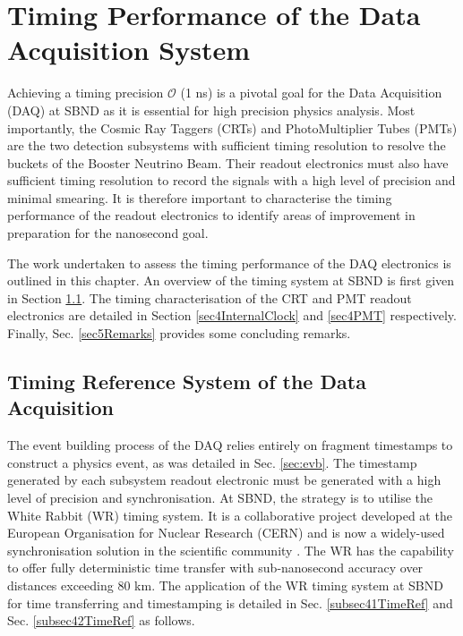 \chapter{Timing Performance of the Data Acquisition System}
\label{ChapterDAQ}
\ifpdf
    \graphicspath{{Chapter7/Figs/Raster/}{Chapter7/Figs/PDF/}{Chapter7/Figs/}}
\else
    \graphicspath{{Chapter7/Figs/Vector/}{Chapter7/Figs/}}
\fi

Achieving a timing precision $\mathcal{O}$ (1 ns) is a pivotal goal for the Data Acquisition (DAQ) at SBND as it is essential for high precision physics analysis. 
Most importantly, the Cosmic Ray Taggers (CRTs) and PhotoMultiplier Tubes (PMTs) are the two detection subsystems with sufficient timing resolution to resolve the buckets of the Booster Neutrino Beam.
Their readout electronics must also have sufficient timing resolution to record the signals with a high level of precision and minimal smearing.
It is therefore important to characterise the timing performance of the readout electronics to identify areas of improvement in preparation for the nanosecond goal. 

The work undertaken to assess the timing performance of the DAQ electronics is outlined in this chapter.
An overview of the timing system at SBND is first given in Section \ref{sec4TimeRef}. 
The timing characterisation of the CRT and PMT readout electronics are detailed in Section \ref{sec4InternalClock} and \ref{sec4PMT} respectively.
Finally, Sec. \ref{sec5Remarks} provides some concluding remarks.

\section{Timing Reference System of the Data Acquisition}
\label{sec4TimeRef}

The event building process of the DAQ relies entirely on fragment timestamps to construct a physics event, as was detailed in Sec. \ref{sec:evb}.
The timestamp generated by each subsystem readout electronic must be generated with a high level of precision and synchronisation.
At SBND, the strategy is to utilise the White Rabbit (WR) timing system.
It is a collaborative project developed at the European Organisation for Nuclear Research (CERN) and is now a widely-used synchronisation solution in the scientific community \cite{WR_paper}.
The WR has the capability to offer fully deterministic time transfer with sub-nanosecond accuracy over distances exceeding 80 km.
The application of the WR timing system at SBND for time transferring and timestamping is detailed in Sec. \ref{subsec41TimeRef} and Sec. \ref{subsec42TimeRef} as follows.

